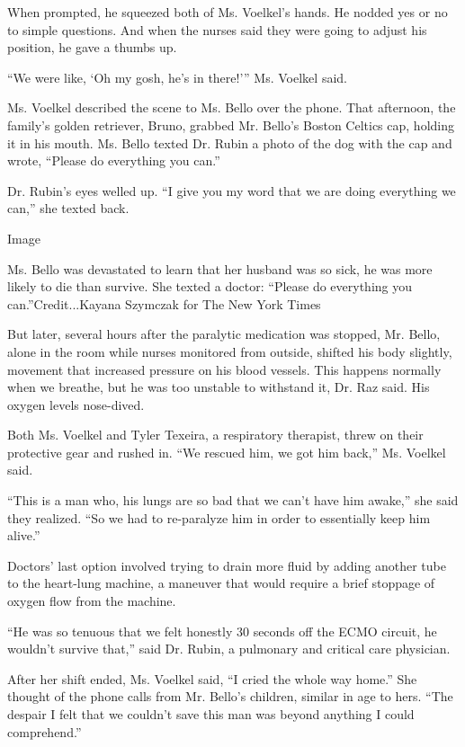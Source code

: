 When prompted, he squeezed both of Ms. Voelkel's hands. He nodded yes or
no to simple questions. And when the nurses said they were going to
adjust his position, he gave a thumbs up.

``We were like, `Oh my gosh, he's in there!''' Ms. Voelkel said.

Ms. Voelkel described the scene to Ms. Bello over the phone. That
afternoon, the family's golden retriever, Bruno, grabbed Mr. Bello's
Boston Celtics cap, holding it in his mouth. Ms. Bello texted Dr. Rubin
a photo of the dog with the cap and wrote, ``Please do everything you
can.''

Dr. Rubin's eyes welled up. ``I give you my word that we are doing
everything we can,'' she texted back.

Image

Ms. Bello was devastated to learn that her husband was so sick, he was
more likely to die than survive. She texted a doctor: ``Please do
everything you can.''Credit...Kayana Szymczak for The New York Times

But later, several hours after the paralytic medication was stopped, Mr.
Bello, alone in the room while nurses monitored from outside, shifted
his body slightly, movement that increased pressure on his blood
vessels. This happens normally when we breathe, but he was too unstable
to withstand it, Dr. Raz said. His oxygen levels nose-dived.

Both Ms. Voelkel and Tyler Texeira, a respiratory therapist, threw on
their protective gear and rushed in. ``We rescued him, we got him
back,'' Ms. Voelkel said.

``This is a man who, his lungs are so bad that we can't have him
awake,'' she said they realized. ``So we had to re-paralyze him in order
to essentially keep him alive.''

Doctors' last option involved trying to drain more fluid by adding
another tube to the heart-lung machine, a maneuver that would require a
brief stoppage of oxygen flow from the machine.

``He was so tenuous that we felt honestly 30 seconds off the ECMO
circuit, he wouldn't survive that,'' said Dr. Rubin, a pulmonary and
critical care physician.

After her shift ended, Ms. Voelkel said, ``I cried the whole way home.''
She thought of the phone calls from Mr. Bello's children, similar in age
to hers. ``The despair I felt that we couldn't save this man was beyond
anything I could comprehend.''

